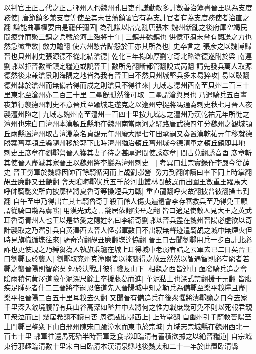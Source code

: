 以判官王正言代之正言鄆州人也魏州孔目吏孔謙勤敏多計數善治簿書晉王以為支度務使|{
	唐節鎮多兼支度等使至其末世藩鎮署官有為支計官者有為支度務使者治直之翻}
謙能曲事權要由是寵任彌固|{
	為孔謙以掊克亂唐張本}
魏州新亂之後府庫空竭民間疲弊而聚三鎮之兵戰於河上殆將十年|{
	三鎮并魏鎮也}
供億軍須未嘗有闕謙之力也然急徵重斂|{
	斂力贍翻}
使六州愁苦歸怨於王亦其所為也|{
	史卒言之}
張彦之以魏博歸晉也貝州刺史張源德不從北結滄德|{
	乾化三年楊師厚劉守奇北略滄德遂附於梁}
南連劉鄩以拒晉數斷鎮定糧道或說晉王|{
	數所角翻斷都管翻說式芮翻}
請先發兵萬人取源德然後東兼滄景則海隅之地皆為我有晉王曰不然貝州城堅兵多未易猝攻|{
	易以豉翻}
德州隸於滄州而無備若得而戍之則滄貝不得往來|{
	九域志德州西南至貝州二百三十里東北至滄州亦二百三十里}
二壘旣孤然後可取|{
	二壘謂滄與貝也}
乃遣騎兵五百晝夜兼行襲德州刺史不意晉兵至踰城走遂克之以遼州守捉將馮通為刺史秋七月晉人夜襲澶州陷之|{
	九域志魏州南至澶州一百四十里按九域志之澶州乃漢乾祐元年所徙之澶州也宋白曰澶州本漢頓丘縣地在魏州南當兩河之驛路唐武德四年分魏州之觀城頓丘兩縣置澶州取古澶淵為名貞觀元年州廢大歷七年田承嗣又奏置漢乾祐元年移就德勝寨舊基頓丘縣隨州移於郭下此時澶州猶治頓丘舊州城今德清軍之頓丘鎮即其地}
刺史王彦章在劉鄩營晉人獲其妻子待之甚厚遣間使誘彦章|{
	間古莧翻誘音酉}
彦章斬其使晉人盡滅其家晉王以魏州將李巖為澶州刺史　|{
	考異曰莊宗實錄作李嚴今從薛史}
晉王勞軍於魏縣因帥百餘騎循河而上覘劉鄩營|{
	勞力到翻帥讀曰率下同上時掌翻覘丑廉翻又丑艷翻}
會天隂晦鄩伏兵五千於河曲叢林間鼔譟而出圍王數重王躍馬大呼帥騎馳突所向披靡禆將夏魯奇等操短兵力戰|{
	重直龍翻呼火故翻披普彼翻操七到翻}
自午至申乃得出亡其七騎魯奇手殺百餘人傷夷遍體會李存審救兵至乃得免王顧謂從騎曰幾為虜嗤|{
	用漢光武之言幾居依翻嗤丑之翻}
皆曰適足使敵人見大王之英武耳魯奇青州人也王以是益愛之賜姓名曰李紹奇劉鄩以晉兵盡在魏州晉陽必虛欲以奇計襲取之乃濳引兵自黄澤西去晉人怪鄩軍數日不出寂無聲迹遣騎覘之城中無煙火但時見旗幟循堞往來|{
	騎奇寄翻覘丑廉翻堞達恊翻}
晉王曰吾聞劉鄩用兵一步百計此必詐也更使覘之乃縛芻為人執旗乘驢在城上耳得城中老弱者詰之云軍去已二日矣晉王曰劉鄩長於襲人|{
	劉鄩取兖州克潼關皆以掩襲得之故云然然以智遇智則必有窮者若鄩之襲晉陽則智窮矣}
短於決戰計彼行纔及山下|{
	相魏之西皆連山}
亟發騎兵追之會隂雨積旬黄澤道險堇泥深尺餘士卒援藤葛而進|{
	堇泥黏土也深式禁翻援于元翻}
皆腹疾足腫死者什二三晉將李嗣恩倍道先入晉陽城中知之勒兵為備鄩至樂平糗糧且盡|{
	樂平拒晉陽二百五十里耳糗去久翻}
又聞晉有備追兵在後衆懼將潰鄩諭之曰今去家千里深入敵境腹背有兵山谷高深如墜井中去將何之惟力戰庶幾可免不則以死報君親耳衆泣而止|{
	幾居希翻不讀曰否}
周德威聞鄩西上|{
	上時掌翻}
自幽州引千騎救晉陽至土門鄩已整衆下山自邢州陳宋口踰漳水而東屯於宗城|{
	九域志宗城縣在魏州西北一百七十里}
鄩軍往還馬死殆半時晉軍乏食鄩知臨清有蓄積欲據之以絶晉糧道|{
	自宗城東行邪趣臨清數十里宋白曰臨清本漢清泉縣地後魏太和二十一年於此置臨清縣}
